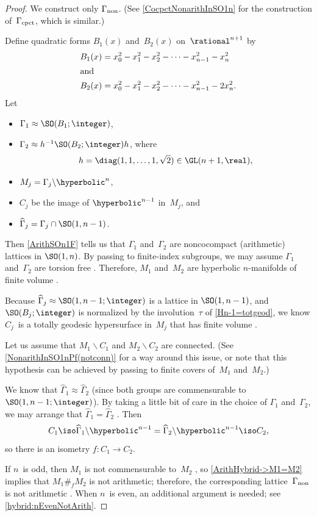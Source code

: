 \begin{proof}
 We construct only $\Gamma_\text{\upshape non}$. (See
\cref{CocpctNonarithInSO1n} for the construction
of~$\Gamma_\text{\upshape cpct}$, which is similar.)

Define quadratic forms $B_1(x)$ and~$B_2(x)$
on~$\rational^{n+1}$ by
 \begin{align*}
 B_1(x) &= x_0^2 - x_1^2 - x_2^2 - \cdots - x_{n-1}^2 - x_n^2 \\
 \intertext{and}
 B_2(x) &= x_0^2 - x_1^2 - x_2^2 - \cdots - x_{n-1}^2 - 2 x_n^2 
 . 
 \end{align*}
 Let
 \begin{itemize}
 \item $\Gamma_1 \approx \SO(B_1;\integer)$,
 \item $\Gamma_2 \approx h^{-1} \SO(B_2;\integer) h$, where
	$$h = \diag(1,1,\ldots,1,\sqrt{2}) \in \GL(n+1,\real) ,$$
 \item $M_j = \Gamma_j \backslash \hyperbolic^n$,
 \item $C_j$ be the image of $\hyperbolic^{n-1}$ in~$M_j$,
 and
 \item $\widehat\Gamma_j = \Gamma_j \cap \SO(1,n-1)$.
 \end{itemize}
 Then \cref{ArithSOn1F} tells us that $\Gamma_1$ and~$\Gamma_2$ are noncocompact
(arithmetic) lattices in $\SO(1,n)$.
By passing to finite-index subgroups, we may assume
$\Gamma_1$ and~$\Gamma_2$ are torsion free
. Therefore, $M_1$ and~$M_2$ are hyperbolic
$n$-manifolds of finite volume .

Because $\widehat\Gamma_j \approx \SO(1,n-1;\integer)$ is a
lattice in $\SO(1,n-1)$, and $\SO(B_j;\integer)$ is
normalized by the involution~$\tau$ of
\cref{Hn-1=totgeod}, we know $C_j$~is a totally
geodesic hypersurface in~$M_j$ that has finite volume
.

Let us assume that $M_1 \smallsetminus C_1$ and $M_2
\smallsetminus C_2$ are connected. (See
\cref{NonarithInSO1nPf(notconn)} for a way around this
issue, or note that this hypothesis can be achieved by
passing to finite covers of~$M_1$ and~$M_2$.)

We know that $\widehat \Gamma_1 \approx \widehat \Gamma_2$ (since
both groups are commensurable to $\SO(1,n-1;\integer)$).
By taking a little bit of care in the choice of $\Gamma_1$
and~$\Gamma_2$, we may arrange that $\widehat \Gamma_1 = \widehat
\Gamma_2$ . Then 
 $$ C_1 \iso \widehat \Gamma_1 \backslash \hyperbolic^{n-1}
 =  \widehat \Gamma_2 \backslash \hyperbolic^{n-1}
 \iso C_2 ,$$
 so there is an isometry $f \colon C_1 \to C_2$.

If $n$~is odd, then $M_1$ is not commensurable to~$M_2$
, so
\cref{ArithHybrid->M1=M2} implies that $M_1 \#_f M_2$
is not arithmetic; therefore, the corresponding
lattice~$\Gamma_\text{\upshape non}$ is not arithmetic
. When $n$~is even, an additional
argument is needed; see \cref{hybrid:nEvenNotArith}.
 \end{proof}



